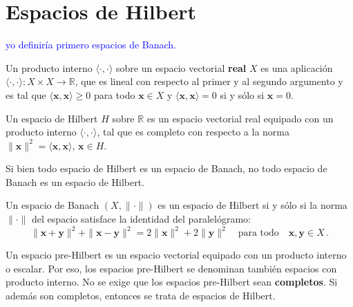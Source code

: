
\section{Espacios de Hilbert}

\textcolor{blue}{yo definir\'ia primero espacios de Banach.}

\begin{mydef}
Un producto interno $\langle\cdot,\cdot\rangle$ sobre un espacio vectorial
{\bf real} $X$ es una aplicaci\'on 
$\langle\cdot,\cdot\rangle:X\times X\to\mathbb{R}$,
que es lineal con respecto al primer y al segundo argumento
y es tal que 
$\langle\mathbf{x}, \mathbf{x}\rangle\geq0$ para todo $\mathbf{x}\in X$
y $\langle\mathbf{x}, \mathbf{x}\rangle=0$ si y s\'olo si $\mathbf{x}=0$.
\end{mydef}

\begin{mydef}
Un espacio de Hilbert $H$ sobre $\mathbb{R}$ es un espacio vectorial real
equipado con un producto interno $\langle\cdot,\cdot\rangle$, tal que
es completo con respecto a la norma
$\|\mathbf{x}\|^{2}= \langle\mathbf{x},\mathbf{x}\rangle$,
$\mathbf{x}\in H$.
\end{mydef}

Si bien todo espacio de Hilbert es un espacio de Banach, 
no todo espacio de Banach es un espacio de Hilbert.

\begin{mydef}
Un espacio de Banach $(X,\|\cdot\|)$ es un espacio de Hilbert
si y s\'olo si la norma $\|\cdot\|$ del espacio satisface la
identidad del paralel\'ogramo:
$$
\|\mathbf{x}+\mathbf{y}\|^2+\|\mathbf{x}-\mathbf{y}\|^2
= 2\|\mathbf{x}\|^2+2\|\mathbf{y}\|^2\quad
\text{para todo}\quad \mathbf{x},\mathbf{y}\in X\,.
$$
\end{mydef}

\begin{mydef}
Un espacio pre-Hilbert es un espacio vectorial equipado con un producto
interno o escalar.
Por eso, los espacios pre-Hilbert se denominan tambi\'en espacios con
producto interno.
No se exige que los espacios pre-Hilbert sean {\bf completos}.
Si adem\'as son completos, entonces se trata de espacios de Hilbert.
\end{mydef}




